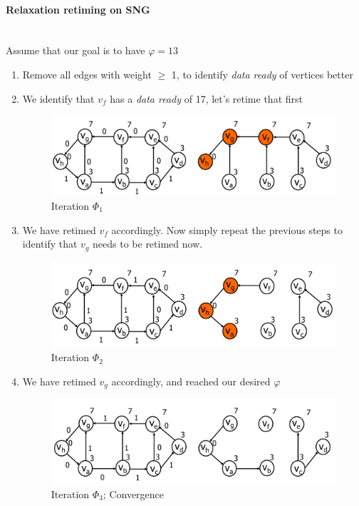 \documentclass{article}
\begin{document}
\paragraph{Relaxation retiming on SNG}\mbox{}\\
Assume that our goal is to have $\varphi = 13$
\begin{enumerate}
    \item Remove all edges with weight $\ge$ 1, to identify \textit{data ready} of vertices better
    \item We identify that $v_{f}$ has a \textit{data ready} of 17, let's retime that first
    \begin{figure}[htp]
        \centering
        \includegraphics[width=14cm, scale=1]{S2/relaxationRetime1.PNG}
        \caption{Iteration $\Phi_{1}$}
    \end{figure}
    \newpage
    \item We have retimed $v_{f}$ accordingly. Now simply repeat the previous steps to identify that $v_{g}$ needs to be retimed now.
    \begin{figure}[htp]
        \centering
        \includegraphics[width=14cm, scale=1]{S2/relaxationRetime2.PNG}
        \caption{Iteration $\Phi_{2}$}
    \end{figure}
    \item We have retimed $v_{g}$ accordingly, and reached our desired $\varphi$
    \begin{figure}[htp]
        \centering
        \includegraphics[width=14cm, scale=1]{S2/relaxationRetime3.PNG}
        \caption{Iteration $\Phi_{3}$; Convergence}
    \end{figure}
\end{enumerate}
\end{document}

